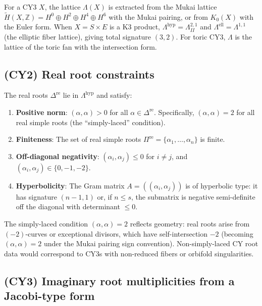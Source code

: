 \begin{remark}
\label{rem:cy1-mukai}
For a CY3 $X$, the lattice $\Lambda(X)$ is extracted from the Mukai lattice $\widetilde{H}(X, \mathbb{Z}) = H^0 \oplus H^2 \oplus H^4 \oplus H^6$ with the Mukai pairing, or from $K_0(X)$ with the Euler form. When $X = S \times E$ is a K3 product, $\Lambda^{\mathrm{hyp}} = \Lambda^{2,1}_{II}$ and $\Lambda^{\mathrm{ell}} = \Lambda^{1,1}$ (the elliptic fiber lattice), giving total signature $(3,2)$. For toric CY3, $\Lambda$ is the lattice of the toric fan with the intersection form.
\end{remark}

\subsection*{(CY2) Real root constraints}

The real roots $\Delta^{\mathrm{re}}$ lie in $\Lambda^{\mathrm{hyp}}$ and satisfy:
\begin{enumerate}[label=(\alph*)]
 \item \textbf{Positive norm}: $(\alpha, \alpha) > 0$ for all $\alpha \in \Delta^{\mathrm{re}}$. Specifically, $(\alpha, \alpha) = 2$ for all real simple roots (the ``simply-laced'' condition).
 \item \textbf{Finiteness}: The set of real simple roots $\Pi^{\mathrm{re}} = \{\alpha_1, \ldots, \alpha_n\}$ is finite.
 \item \textbf{Off-diagonal negativity}: $(\alpha_i, \alpha_j) \leq 0$ for $i \neq j$, and $(\alpha_i, \alpha_j) \in \{0, -1, -2\}$.
 \item \textbf{Hyperbolicity}: The Gram matrix $A = ((\alpha_i, \alpha_j))$ is of hyperbolic type: it has signature $(n-1, 1)$ or, if $n \leq s$, the submatrix is negative semi-definite off the diagonal with determinant $\leq 0$.
\end{enumerate}

\begin{remark}
\label{rem:cy2-simply-laced}
The simply-laced condition $(\alpha, \alpha) = 2$ reflects geometry: real roots arise from $(-2)$-curves or exceptional divisors, which have self-intersection $-2$ (becoming $(\alpha, \alpha) = 2$ under the Mukai pairing sign convention). Non-simply-laced CY root data would correspond to CY3s with non-reduced fibers or orbifold singularities.
\end{remark}

\subsection*{(CY3) Imaginary root multiplicities from a Jacobi-type form}

